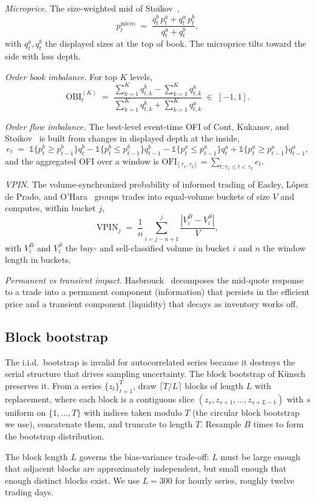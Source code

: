 \documentclass[11pt]{article}
\begin{document}
\emph{Microprice.} The size-weighted mid of Stoikov~\cite{stoikov2018microprice},
\[
p^{\mathrm{micro}}_t \;=\; \frac{q^b_t \, p^a_t + q^a_t \, p^b_t}{q^a_t + q^b_t},
\]
with $q^a_t, q^b_t$ the displayed sizes at the top of book. The microprice tilts toward the
side with less depth.

\emph{Order book imbalance.} For top $K$ levels,
\[
\mathrm{OBI}_t^{(K)} \;=\; \frac{\sum_{k=1}^{K} q^b_{t,k} - \sum_{k=1}^{K} q^a_{t,k}}
    {\sum_{k=1}^{K} q^b_{t,k} + \sum_{k=1}^{K} q^a_{t,k}} \;\in\; [-1, 1].
\]

\emph{Order flow imbalance.} The best-level event-time OFI of Cont, Kukanov, and
Stoikov~\cite{contkukanovstoikov2014} is built from changes in displayed depth at the inside,
\[
e_t \;=\; \mathbb{1}\{p^b_t \geq p^b_{t-1}\} q^b_t - \mathbb{1}\{p^b_t \leq p^b_{t-1}\} q^b_{t-1}
    - \mathbb{1}\{p^a_t \leq p^a_{t-1}\} q^a_t + \mathbb{1}\{p^a_t \geq p^a_{t-1}\} q^a_{t-1},
\]
and the aggregated OFI over a window is
$\mathrm{OFI}_{[\tau_1, \tau_2]} = \sum_{t: \tau_1 \leq t < \tau_2} e_t$.

\emph{VPIN.} The volume-synchronized probability of informed trading of Easley, L\'opez de
Prado, and O'Hara~\cite{easley2012vpin} groups trades into equal-volume buckets of size $V$
and computes, within bucket $j$,
\[
\mathrm{VPIN}_j \;=\; \frac{1}{n} \sum_{i=j-n+1}^{j} \frac{|V_i^B - V_i^S|}{V},
\]
with $V_i^B$ and $V_i^S$ the buy- and sell-classified volume in bucket $i$ and $n$ the
window length in buckets.

\emph{Permanent vs transient impact.} Hasbrouck~\cite{hasbrouck1991measuring} decomposes
the mid-quote response to a trade into a permanent component (information) that persists in
the efficient price and a transient component (liquidity) that decays as inventory works
off.

\subsection{Block bootstrap}
\label{app:bb}

The i.i.d.~bootstrap is invalid for autocorrelated series because it destroys the serial
structure that drives sampling uncertainty. The block bootstrap of
K\"unsch~\cite{kunsch1989block} preserves it. From a series $\{z_t\}_{t=1}^{T}$, draw
$\lceil T / L \rceil$ blocks of length $L$ with replacement, where each block is a
contiguous slice $(z_s, z_{s+1}, \dots, z_{s+L-1})$ with $s$ uniform on
$\{1, \dots, T\}$ with indices taken modulo $T$ (the circular block bootstrap we use), concatenate them, and truncate to length $T$. Resample $B$ times
to form the bootstrap distribution.

The block length $L$ governs the bias-variance trade-off: $L$ must be large enough that
adjacent blocks are approximately independent, but small enough that enough distinct blocks
exist. We use $L = 300$ for hourly series, roughly twelve trading days.
\end{document}

